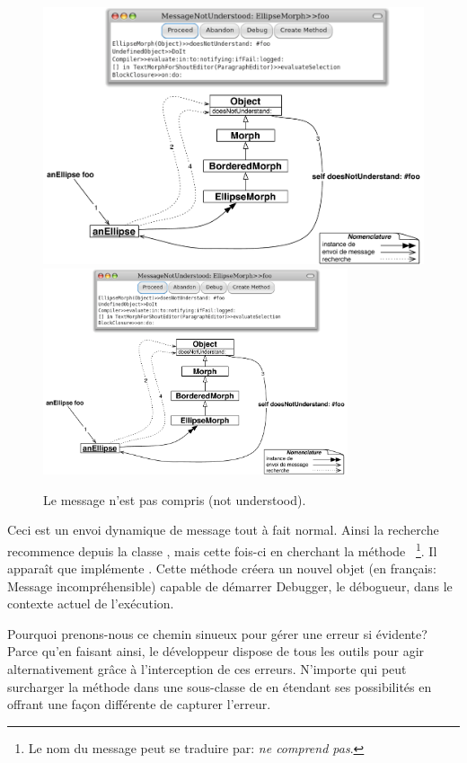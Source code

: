 \documentclass[a4paper,10pt,twoside]{book}
\begin{document}
\begin{figure}[htb]
\begin{center}
\ifluluelse
	{\includegraphics[width=\textwidth]{fooNotFound}}
	{\includegraphics[width=0.8\textwidth]{fooNotFound}}
\caption{Le message  n'est pas compris (not understood).}
\end{center}
\end{figure}

Ceci est un envoi dynamique de message tout à fait normal. Ainsi
la recherche recommence depuis la classe , mais
cette fois-ci en cherchant la méthode ~\footnote{Le nom du message peut se traduire par: \emph{ne comprend pas}.}.
Il apparaît que  implémente .
Cette méthode créera un nouvel objet  (en français: Message incompréhensible) capable de démarrer Debugger, le débogueur, dans le contexte actuel de l'exécution.

Pourquoi prenons-nous ce chemin sinueux pour gérer une erreur si évidente?
Parce qu'en faisant ainsi, le développeur dispose de tous les outils pour
agir alternativement grâce à l'interception de ces erreurs.
N'importe qui peut surcharger la méthode  
dans une sous-classe de  en étendant ses possibilités en
offrant une façon différente de capturer l'erreur.
\end{document}
